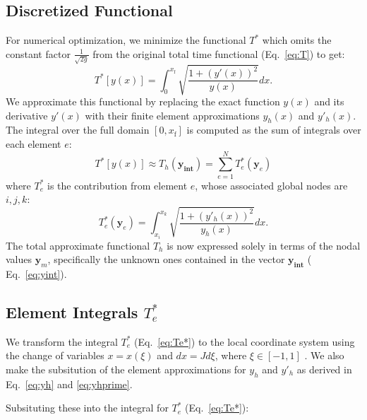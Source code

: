 \documentclass[11pt]{article}
\begin{document}
\subsection{Discretized Functional}
    
    For numerical optimization, we minimize the functional \( T^* \) which omits the constant factor \( \frac{1}{\sqrt{2g}} \) from the original total time functional (Eq.~\eqref{eq:T}) to get:
    \begin{equation}
        T^*[y(x)] = \int_0^{x_{\mathrm{f}}} \sqrt{\frac{1 + (y'(x))^2}{y(x)}} dx .
    \label{eq:T*}
    \end{equation}
    We approximate this functional by replacing the exact function \( y(x) \) and its derivative \( y'(x) \) with their finite element approximations \( y_h (x) \) and \( y'_h (x) \). The integral over the full domain \( [0, x_{\mathrm{f}}] \) is computed as the sum of integrals over each element \(e\):
    \begin{equation}
        T^*[y(x)] \approx T_h(\mathbf{y_\text{int}}) = \sum_{e=1}^{N} T_e^*(\mathbf{y}_e) \label{eq:Th}
    \end{equation}
    where \( T_e^* \) is the contribution from element \(e\), whose associated global nodes are \(i, j, k\):
    \begin{equation}
        T_e^*(\mathbf{y}_e) = \int_{x_{i}}^{x_{k}} \sqrt{\frac{1 + (y'_h(x))^2}{y_h(x)}} dx. \label{eq:Te*}
    \end{equation}
    The total approximate functional \( T_h \) is now expressed solely in terms of the nodal values \(\mathbf{y}_m\), specifically the unknown ones contained in the vector \(\mathbf{y_\text{int}}\) ( Eq.~\eqref{eq:yint}). 

\subsection{Element Integrals \( T^{*} _e \) }

We transform the integral \( T_e^* \) (Eq.~\eqref{eq:Te*}) to the local coordinate system using the change of variables \( x = x(\xi) \) and \( dx = J d\xi \), where \( \xi \in [-1, 1] \) . We also make the subsitution of the element approximations for \( y_h \) and \( y'_h \) as derived in Eq.~\eqref{eq:yh} and \eqref{eq:yhprime}.

Subsituting these into the integral for \( T^{*} _e \) (Eq.~\eqref{eq:Te*}): 
 
\end{document}
